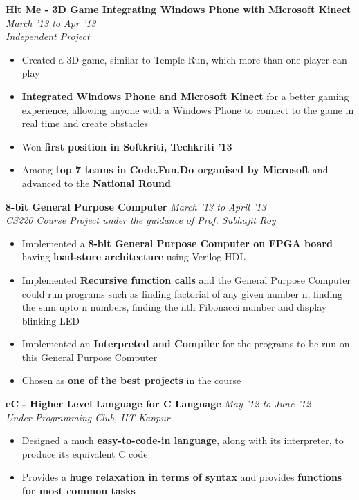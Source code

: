 \documentclass[9pt]{article}
\newenvironment{changemargin}[2]{%
  \begin{list}{}{%
    \setlength{\topsep}{0pt}%
    \setlength{\leftmargin}{#1}%
    \setlength{\rightmargin}{#2}%
    \setlength{\listparindent}{\parindent}%
    \setlength{\itemindent}{\parindent}%
    \setlength{\parsep}{\parskip}%
  }%
  \item[]}{\end{list}
}
\newenvironment{body} {
	\vspace*{-16pt}
	\begin{changemargin}{-0.6in}{-0.65in}
  }	
	{\end{changemargin}
}
\begin{document}
\begin{body}
\begin{itemize}
	\end{itemize}
	\smallskip
	\textbf{Hit Me - 3D Game Integrating Windows Phone with Microsoft Kinect} \hfill \emph{March '13 to Apr '13}\\
	\emph{Independent Project}\\
	\begin{itemize}
		\item{Created a 3D game, similar to Temple Run, which more than one player can play}
		\item{\textbf{Integrated Windows Phone and Microsoft Kinect} for a better gaming experience, allowing anyone with a Windows Phone to connect to the game in real time and create obstacles}
		\item{Won \textbf{first position in Softkriti, Techkriti '13}}
		\item{Among \textbf{top 7 teams in Code.Fun.Do organised by Microsoft} and advanced to the \textbf{National Round}}
	\end{itemize}
	\smallskip
	\textbf{8-bit General Purpose Computer} \hfill \emph{March '13 to April '13}\\
	\emph{CS220 Course Project under the guidance of Prof. Subhajit Roy}
	\begin{itemize}
		\item{Implemented a \textbf{8-bit General Purpose Computer on FPGA board} having \textbf{load-store architecture} using Verilog HDL}
		\item{Implemented \textbf{Recursive function calls} and the General Purpose Computer could run programs such as finding factorial of any given number n, finding the sum upto n numbers, finding the nth Fibonacci number and display blinking LED}
		\item{Implemented an \textbf{Interpreted and Compiler} for the programs to be run on this General Purpose Computer}
		\item{Chosen as \textbf{one of the best projects} in the course}
	\end{itemize}
	\smallskip
	\textbf{eC - Higher Level Language for C Language} \hfill \emph{May '12 to June '12}\\
	\emph{Under Programming Club, IIT Kanpur}
	\begin{itemize}
		\item{Designed a much \textbf{easy-to-code-in language}, along with its interpreter, to produce its equivalent C code}
		\item{Provides a \textbf{huge relaxation in terms of syntax} and provides \textbf{functions for most common tasks}}

\end{itemize}
\end{body}
\end{document}
